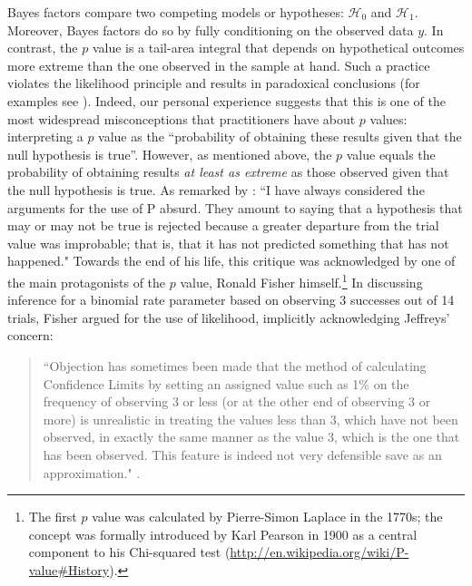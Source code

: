 Bayes factors compare two competing models or hypotheses: $\mathcal{H}_0$ and $\mathcal{H}_1$. Moreover, Bayes factors do so by fully conditioning on the observed data $y$. In contrast, the $p$ value is a tail-area integral that depends on hypothetical outcomes more extreme than the one observed in the sample at hand. Such a practice violates the likelihood principle and results in paradoxical conclusions (for examples see ). Indeed, our personal experience suggests that this is one of the most widespread misconceptions that practitioners have about $p$ values: interpreting a $p$ value as the ``probability of obtaining these results given that the null hypothesis is true''. However, as mentioned above, the $p$ value equals the probability of obtaining results \emph{at least as extreme} as those observed given that the null hypothesis is true. As remarked by : ``I have always considered the arguments for the use of P absurd. They amount to saying that a hypothesis that may or may not be true is rejected because a greater departure from the trial value was improbable; that is, that it has not predicted something that has not happened." Towards the end of his life, this critique was acknowledged by one of the main protagonists of the $p$ value, Ronald Fisher himself.\footnote{The first $p$ value was calculated by Pierre-Simon Laplace in the 1770s; the concept was formally introduced by Karl Pearson in 1900 as a central component to his Chi-squared test (\url{http://en.wikipedia.org/wiki/P-value#History}).} In discussing inference for a binomial rate parameter based on observing 3 successes out of 14 trials, Fisher argued for the use of likelihood, implicitly acknowledging Jeffreys' concern:
\begin{quotation}
``Objection has sometimes been made that the method of calculating Confidence Limits by setting an assigned value such as 1\% on the frequency of observing 3 or less (or at the other end of observing 3 or more) is unrealistic in treating the values less than 3, which have not been observed, in exactly the same manner as the value 3, which is the one that has been observed. This feature is indeed not very defensible save as an approximation." \cite[p. 68]{Fisher1959}.
\end{quotation}

